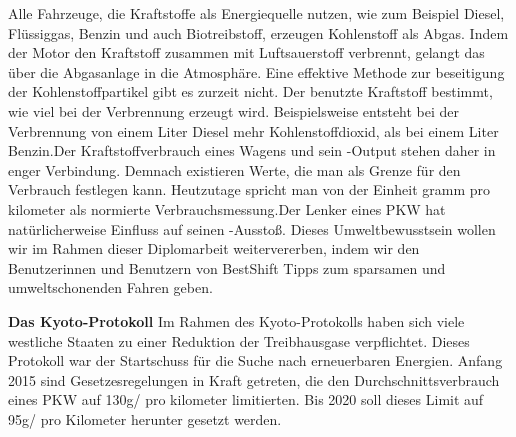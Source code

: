 Alle Fahrzeuge, die Kraftstoffe als Energiequelle nutzen, wie zum Beispiel Diesel, Flüssiggas, Benzin und auch Biotreibstoff, erzeugen Kohlenstoff als Abgas. Indem der Motor den Kraftstoff zusammen mit Luftsauerstoff verbrennt, gelangt das  über die Abgasanlage in die Atmosphäre. Eine effektive Methode zur beseitigung der Kohlenstoffpartikel gibt es zurzeit nicht. Der benutzte Kraftstoff bestimmt, wie viel  bei der Verbrennung erzeugt wird. Beispielsweise entsteht bei der Verbrennung von einem Liter Diesel mehr Kohlenstoffdioxid, als bei einem Liter Benzin.Der Kraftstoffverbrauch eines Wagens und sein -Output stehen daher in enger Verbindung. Demnach existieren Werte, die man als Grenze für den Verbrauch festlegen kann. Heutzutage spricht man von der Einheit gramm pro kilometer als normierte Verbrauchsmessung.Der Lenker eines PKW hat natürlicherweise Einfluss auf seinen -Ausstoß. Dieses Umweltbewusstsein wollen wir im Rahmen dieser Diplomarbeit weitervererben, indem wir den Benutzerinnen und Benutzern von BestShift Tipps zum sparsamen und umweltschonenden Fahren geben. \nextline

\textbf{Das Kyoto-Protokoll\nextline}
Im Rahmen des Kyoto-Protokolls haben sich viele westliche Staaten zu einer Reduktion der Treibhausgase verpflichtet. 
Dieses Protokoll war der Startschuss für die Suche nach erneuerbaren Energien. 
Anfang 2015 sind Gesetzesregelungen in Kraft getreten, die den Durchschnittsverbrauch eines PKW auf 130g/ pro kilometer limitierten. 
Bis 2020 soll dieses Limit auf 95g/ pro Kilometer herunter gesetzt werden.




\clearpage %